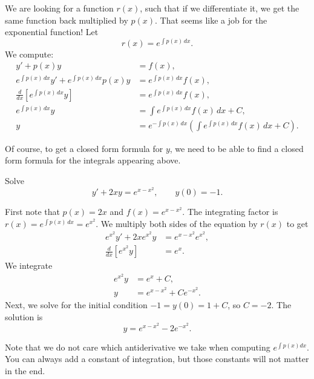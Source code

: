 We are looking for a function $r(x)$, such that if
we differentiate it, we get the same function back multiplied by $p(x)$.
That seems like a job for the exponential function!  Let
\begin{equation*}
r(x) = e^{\int p(x) \,dx} .
\end{equation*}
We compute:
\begin{align*}
y' + p(x) y &= f(x) , \\
e^{\int p(x) \,dx} y' + e^{\int p(x) \,dx} p(x) y & = e^{\int p(x) \,dx} f(x) , \\
\frac{d}{dx}\left[ e^{\int p(x) \,dx} y \right] & = e^{\int p(x) \,dx} f(x) , \\
e^{\int p(x) \,dx} y & = \int e^{\int p(x) \,dx} f(x) \,dx + C , \\
y & = e^{-\int p(x) \,dx} \left( \int e^{\int p(x) \,dx} f(x) \,dx + C \right) .
\end{align*}

Of course, to get a closed form formula for $y$,
we need to be able to find a
closed form formula for the integrals appearing above.

\begin{example}
Solve
\begin{equation*}
y' + 2xy = e^{x-x^2}, \qquad y(0) = -1 .
\end{equation*}

First note that $p(x) = 2x$ and $f(x) = e^{x-x^2}$.
The integrating factor is $r(x) = e^{\int p(x)\, dx} = e^{x^2}$.
We multiply both sides of the equation by $r(x)$ to get
\begin{align*}
e^{x^2} y' + 2xe^{x^2}y & = e^{x-x^2} e^{x^2} , \\
\frac{d}{dx} \left[ e^{x^2} y \right] &= e^x .
\end{align*}
We integrate
\begin{align*}
e^{x^2} y &= e^x +C , \\
y &= e^{x-x^2} + C e^{-x^2} .
\end{align*}
Next, we solve for the initial condition $-1 = y(0) = 1 + C$, so $C=-2$.
The solution is
\begin{equation*}
y = e^{x-x^2} - 2 e^{-x^2} .
\end{equation*}
\end{example}

Note that we do not care which antiderivative we take when computing
$e^{\int p(x) dx}$.  You can always add a constant of integration,
but those constants
will not matter in the end.

